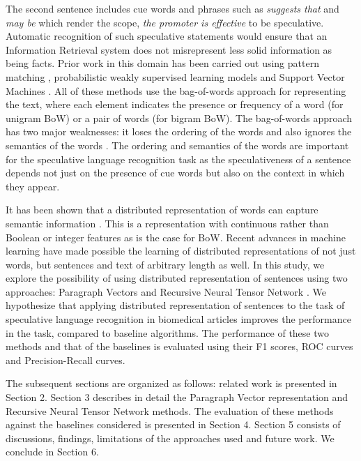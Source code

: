 \documentclass{article}
\begin{document}
The second sentence includes cue words and phrases such as {\it suggests that} and {\it may be} which render the scope, {\it the promoter is effective} to be speculative. Automatic recognition of such speculative statements would ensure that an Information Retrieval system does not misrepresent less solid information as being facts. Prior work in this domain has been carried out using pattern matching \autocite{Malhotra2013}, probabilistic weakly supervised learning models and Support Vector Machines \autocite{Medlock2007}. All of these methods use the bag-of-words approach for representing the text, where each element indicates the presence or frequency of a word (for unigram BoW) or a pair of words (for bigram BoW). The bag-of-words approach has two major weaknesses: it loses the ordering of the words and also ignores the semantics of the words \autocite{Le2014}. The ordering and semantics of the words are important for the speculative language recognition task as the speculativeness of a sentence depends not just on the presence of cue words but also on the context in which they appear.

It has been shown that a distributed representation of words can capture semantic information \autocite{mikolov2013efficient}. This is a representation with continuous rather than Boolean or integer features as is the case for BoW. Recent advances in machine learning have made possible the learning of distributed representations of not just words, but sentences and text of arbitrary length as well. In this study, we explore the possibility of using distributed representation of sentences using two approaches: Paragraph Vectors \autocite{Le2014} and Recursive Neural Tensor Network \autocite{Socher2013}. We hypothesize that applying distributed representation of sentences to the task of speculative language recognition in biomedical articles improves the performance in the task, compared to baseline algorithms. The performance of these two methods and that of the baselines is evaluated using their F1 scores, ROC curves and Precision-Recall curves.

The subsequent sections are organized as follows: related work is presented in Section 2. Section 3 describes in detail the Paragraph Vector representation and Recursive Neural Tensor Network methods. The evaluation of these methods against the baselines considered is presented in Section 4. Section 5 consists of discussions, findings, limitations of the approaches used and future work. We conclude in Section 6.
\end{document}
